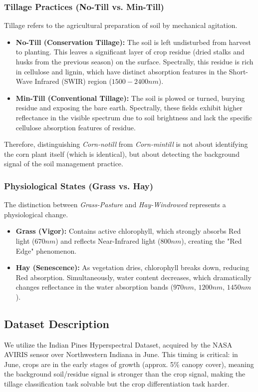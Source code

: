 \documentclass[conference]{IEEEtran}
\begin{document}
\subsubsection{Tillage Practices (No-Till vs. Min-Till)}
Tillage refers to the agricultural preparation of soil by mechanical agitation.
\begin{itemize}
    \item \textbf{No-Till (Conservation Tillage):} The soil is left undisturbed from harvest to planting. This leaves a significant layer of crop residue (dried stalks and husks from the previous season) on the surface. Spectrally, this residue is rich in cellulose and lignin, which have distinct absorption features in the Short-Wave Infrared (SWIR) region ($1500-2400 nm$).
    \item \textbf{Min-Till (Conventional Tillage):} The soil is plowed or turned, burying residue and exposing the bare earth. Spectrally, these fields exhibit higher reflectance in the visible spectrum due to soil brightness and lack the specific cellulose absorption features of residue.
\end{itemize}
Therefore, distinguishing \textit{Corn-notill} from \textit{Corn-mintill} is not about identifying the corn plant itself (which is identical), but about detecting the background signal of the soil management practice.

\subsubsection{Physiological States (Grass vs. Hay)}
The distinction between \textit{Grass-Pasture} and \textit{Hay-Windrowed} represents a physiological change.
\begin{itemize}
    \item \textbf{Grass (Vigor):} Contains active chlorophyll, which strongly absorbs Red light ($670 nm$) and reflects Near-Infrared light ($800 nm$), creating the "Red Edge" phenomenon.
    \item \textbf{Hay (Senescence):} As vegetation dries, chlorophyll breaks down, reducing Red absorption. Simultaneously, water content decreases, which dramatically changes reflectance in the water absorption bands ($970 nm$, $1200 nm$, $1450 nm$).
\end{itemize}

\subsection{Dataset Description}
We utilize the Indian Pines Hyperspectral Dataset, acquired by the NASA AVIRIS sensor over Northwestern Indiana in June. This timing is critical: in June, crops are in the early stages of growth (approx. 5\% canopy cover), meaning the background soil/residue signal is stronger than the crop signal, making the tillage classification task solvable but the crop differentiation task harder.
\end{document}
